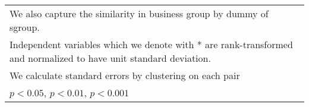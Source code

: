{\begin{tabular}{l*{7}{c}}
\multicolumn{8}{l}{\footnotesize We also capture the similarity in business group by dummy of sgroup.}\\
\multicolumn{8}{l}{\footnotesize Independent variables which  we denote with * are rank-transformed and normalized to have unit standard deviation.}\\
\multicolumn{8}{l}{\footnotesize  We calculate standard errors by clustering on each pair}\\
\multicolumn{8}{l}{\footnotesize \sym{*} \(p<0.05\), \sym{**} \(p<0.01\), \sym{***} \(p<0.001\)}\\
\end{tabular}
}
